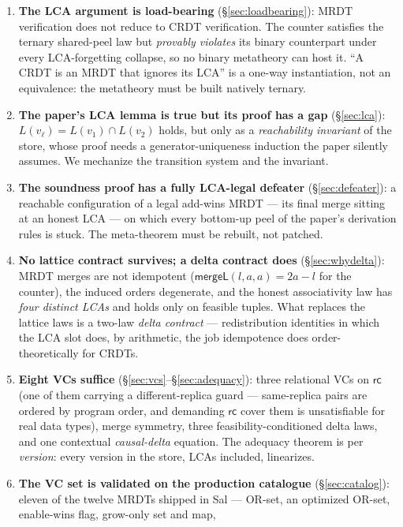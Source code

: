 \documentclass[11pt]{article}
\newcommand{\mergeL}{\mathsf{mergeL}}
\begin{document}
\begin{enumerate}[leftmargin=2em]
\item \textbf{The LCA argument is load-bearing}
  (\S\ref{sec:loadbearing}): MRDT verification does not reduce to CRDT
  verification. The counter satisfies the ternary shared-peel law but
  \emph{provably violates} its binary counterpart under every
  LCA-forgetting collapse, so no binary metatheory can host it. ``A CRDT
  is an MRDT that ignores its LCA'' is a one-way instantiation, not an
  equivalence: the metatheory must be built natively ternary.
\item \textbf{The paper's LCA lemma is true but its proof has a gap}
  (\S\ref{sec:lca}): $L(v_\ell) = L(v_1) \cap L(v_2)$ holds, but only as a
  \emph{reachability invariant} of the store, whose proof needs a
  generator-uniqueness induction the paper silently assumes. We mechanize
  the transition system and the invariant.
\item \textbf{The soundness proof has a fully LCA-legal defeater}
  (\S\ref{sec:defeater}): a reachable configuration of a legal add-wins
  MRDT --- its final merge sitting at an honest LCA --- on which every
  bottom-up peel of the paper's derivation rules is stuck. The
  meta-theorem must be rebuilt, not patched.
\item \textbf{No lattice contract survives; a delta contract does}
  (\S\ref{sec:whydelta}): MRDT merges are not idempotent
  ($\mergeL(l,a,a)=2a-l$ for the counter), the induced orders degenerate,
  and the honest associativity law has \emph{four distinct LCAs} and holds
  only on feasible tuples. What replaces the lattice laws is a two-law
  \emph{delta contract} --- redistribution identities in which the LCA
  slot does, by arithmetic, the job idempotence does order-theoretically
  for CRDTs.
\item \textbf{Eight VCs suffice} (\S\ref{sec:vcs}--\S\ref{sec:adequacy}):
  three relational VCs on $\mathsf{rc}$ (one of them carrying a
  different-replica guard --- same-replica pairs are ordered by program
  order, and demanding $\mathsf{rc}$ cover them is unsatisfiable for
  real data types), merge symmetry, three
  feasibility-conditioned delta laws, and one contextual \emph{causal-delta}
  equation. The adequacy theorem is per \emph{version}: every version in
  the store, LCAs included, linearizes.
\item \textbf{The VC set is validated on the production catalogue}
  (\S\ref{sec:catalog}): eleven of the twelve MRDTs shipped in Sal ---
  OR-set, an optimized OR-set, enable-wins flag, grow-only set and map,

\end{enumerate}
\end{document}
